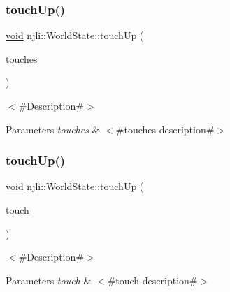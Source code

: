 \subsubsection{\texorpdfstring{touch\+Up()}{touchUp()}\hspace{0.1cm}{\footnotesize\ttfamily [1/2]}}
{\footnotesize\ttfamily \mbox{\hyperlink{_thread_8h_af1e856da2e658414cb2456cb6f7ebc66}{void}} njli\+::\+World\+State\+::touch\+Up (\begin{DoxyParamCaption}\item[{\mbox{\hyperlink{classnjli_1_1_device_touch}{Device\+Touch}} $\ast$$\ast$}]{touches }\end{DoxyParamCaption})}

$<$\#\+Description\#$>$


\begin{DoxyParams}{Parameters}
{\em touches} & $<$\#touches description\#$>$ \\
\hline
\end{DoxyParams}
\mbox{\label{classnjli_1_1_world_state_a2fdcb6959ad9805488ebb591919945bb}} 
\subsubsection{\texorpdfstring{touch\+Up()}{touchUp()}\hspace{0.1cm}{\footnotesize\ttfamily [2/2]}}
{\footnotesize\ttfamily \mbox{\hyperlink{_thread_8h_af1e856da2e658414cb2456cb6f7ebc66}{void}} njli\+::\+World\+State\+::touch\+Up (\begin{DoxyParamCaption}\item[{const \mbox{\hyperlink{classnjli_1_1_device_touch}{Device\+Touch}} \&}]{touch }\end{DoxyParamCaption})}

$<$\#\+Description\#$>$


\begin{DoxyParams}{Parameters}
{\em touch} & $<$\#touch description\#$>$ \\
\hline
\end{DoxyParams}
\mbox{\label{classnjli_1_1_world_state_a2180d81af9c682241e46530078272537}} 
